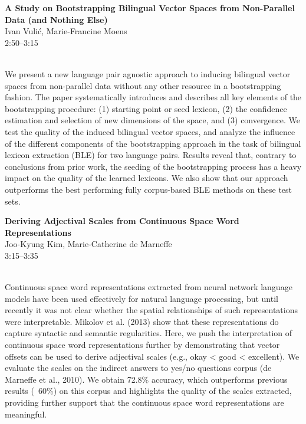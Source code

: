 \documentclass[twoside,makeidx]{book}
\begin{document}
\par\vspace{2em}\noindent%
\begin{minipage}{\linewidth}%
\begin{center}
\textbf{\normalsize A Study on Bootstrapping Bilingual Vector Spaces from Non-Parallel Data (and Nothing Else)}\\
\normalsize  Ivan Vuli\'{c},  Marie-Francine Moens\\
{\small 2:50--3:15}\\
\end{center}
\end{minipage}\\[0.5em]
\nopagebreak%
\noindent%
{\small We present a new language pair agnostic approach to inducing bilingual vector spaces from non-parallel data without any other resource in a bootstrapping fashion. The paper systematically introduces and describes all key elements of the bootstrapping procedure: (1) starting point or seed lexicon, (2) the confidence estimation and selection of new dimensions of the space, and (3) convergence. We test the quality of the induced bilingual vector spaces, and analyze the influence of the different components of the bootstrapping approach in the task of bilingual lexicon extraction (BLE) for two language pairs. Results reveal that, contrary to conclusions from prior work, the seeding of the bootstrapping process has a heavy impact on the quality of the learned lexicons. We also show that our approach outperforms the best performing fully corpus-based BLE methods on these test sets.}
\par\vspace{2em}\noindent%
\begin{minipage}{\linewidth}%
\begin{center}
\textbf{\normalsize Deriving Adjectival Scales from Continuous Space Word Representations}\\
\normalsize  Joo-Kyung Kim,  Marie-Catherine de Marneffe\\
{\small 3:15--3:35}\\
\end{center}
\end{minipage}\\[0.5em]
\nopagebreak%
\noindent%
{\small Continuous space word representations extracted from neural network language models have been used effectively for natural language processing, but until recently it was not clear whether the spatial relationships of such representations were interpretable. Mikolov et al. (2013) show that these representations do capture syntactic and semantic regularities. Here, we push the interpretation of continuous space word representations further by demonstrating that vector offsets can be used to derive adjectival scales (e.g., okay < good < excellent). We evaluate the scales on the indirect answers to yes/no questions corpus (de Marneffe et al., 2010). We obtain 72.8\% accuracy, which outperforms previous results (~60\%) on this corpus and highlights the quality of the scales extracted, providing further support that the continuous space word representations are meaningful.}
\clearpage
\end{document}
